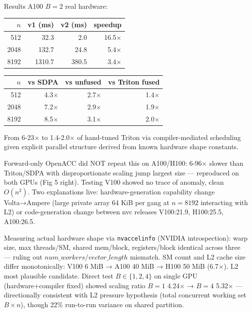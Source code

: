 \documentclass[11pt]{article}
\begin{document}
Results A100 $B=2$ real hardware:
\begin{table}[h]\centering
\begin{tabular}{rrrr}
\toprule $n$ & v1 (ms) & v2 (ms) & speedup\\ \midrule 512 & 32.3 & 2.0 & 16.5$\times$\\ 2048 & 132.7 & 24.8 & 5.4$\times$\\ 8192 & 1310.7 & 380.5 & 3.4$\times$\\ \bottomrule
\end{tabular}
\end{table}

\begin{table}[h]\centering
\begin{tabular}{rrrr}
\toprule $n$ & vs SDPA & vs unfused & vs Triton fused\\ \midrule 512 & 4.3$\times$ & 2.7$\times$ & 1.4$\times$\\ 2048 & 7.2$\times$ & 2.9$\times$ & 1.9$\times$\\ 8192 & 8.5$\times$ & 3.1$\times$ & 2.0$\times$\\ \bottomrule
\end{tabular}
\end{table}
From 6-23$\times$ to 1.4-2.0$\times$ of hand-tuned Triton via compiler-mediated scheduling given explicit parallel structure derived from known hardware shape constants.

Forward-only OpenACC did NOT repeat this on A100/H100: 6-96$\times$ slower than Triton/SDPA with disproportionate scaling jump largest size — reproduced on both GPUs (Fig 5 right). Testing V100 showed no trace of anomaly, clean $O(n^2)$. Two explanations live: hardware-generation capability change Volta→Ampere (large private array 64 KiB per gang at $n=8192$ interacting with L2) or code-generation change between nvc releases V100:21.9, H100:25.5, A100:26.5.

Measuring actual hardware shape via \texttt{nvaccelinfo} (NVIDIA introspection): warp size, max threads/SM, shared mem/block, registers/block identical across three — ruling out $num\_workers/vector\_length$ mismatch. SM count and L2 cache size differ monotonically: V100 6 MiB → A100 40 MiB → H100 50 MiB (6.7$\times$). L2 most plausible candidate. Direct test $B\in\{1,2,4\}$ on single GPU (hardware+compiler fixed) showed scaling ratio $B=1$ 4.24$\times$ → $B=4$ 5.32$\times$ — directionally consistent with L2 pressure hypothesis (total concurrent working set $B\times n$), though 22\% run-to-run variance on shared partition.
\end{document}
